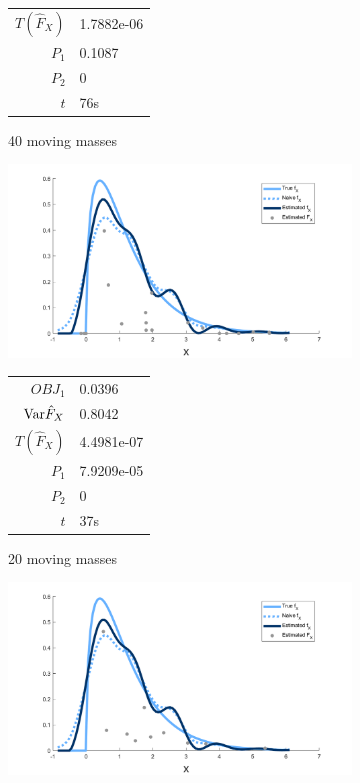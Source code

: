 \begin{figure}
\begin{subfigure}[b]{0.49\textwidth}
\begin{tabular}{r l}
			$T(\hat{F}_X)$ & 1.7882e-06\\
			$P_1$ & 0.1087\\
			$P_2$ & 0\\
			$t$ & 76s
		\end{tabular}
		\caption{40 moving masses}
		\label{fig:moving masses m40 example}
	\end{subfigure}
	\begin{subfigure}[b]{0.49\textwidth}
		\centering
		\includegraphics[width = \textwidth]{Figures/Deconvolution/moving_masses_m20_example.png}
		\begin{tabular}{r l}
			$OBJ_1$ & 0.0396\\
			$\mathrm{Var} \hat{F}_X$ & 0.8042\\
			$T(\hat{F}_X)$ & 4.4981e-07\\
			$P_1$ & 7.9209e-05\\
			$P_2$ & 0\\
			$t$ & 37s
		\end{tabular}
		\caption{20 moving masses}
		\label{fig:moving masses m20 example}
	\end{subfigure}
	\hfill
	\begin{subfigure}[b]{0.49\textwidth}
		\centering
		\includegraphics[width = \textwidth]{Figures/Deconvolution/moving_masses_m10_example.png}

\end{subfigure}
\end{figure}
